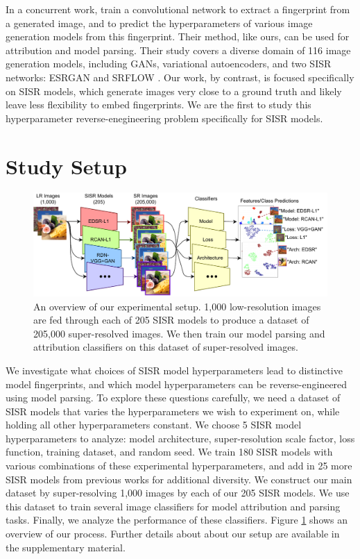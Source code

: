 \documentclass[10pt]{article} %
\begin{document}
In a concurrent work, \cite{Asnani2021ReverseEO} train a convolutional network to extract a fingerprint from a generated image, and to predict the hyperparameters of various image generation models from this fingerprint. Their method, like ours, can be used for  attribution and model parsing. Their study covers a diverse domain of 116 image generation models, including GANs, variational autoencoders, and two SISR networks: ESRGAN  \citep{wang2018esrgan} and SRFLOW \citep{lugmayr2020srflow}. Our work, by contrast, is focused specifically on SISR models, which generate images very close to a ground truth and likely leave less flexibility to embed fingerprints. We are the first to study this hyperparameter reverse-enegineering problem specifically for SISR models.

\section{Study Setup}

\begin{figure}[t]
    \centering
    \includegraphics[width=1.0\textwidth]{figures/Figure_1.pdf}
    \caption{An overview of our experimental setup. 1,000 low-resolution images are fed through
each of 205 SISR models to produce a dataset of 205,000 super-resolved images. We then train our model parsing and attribution classifiers on this dataset of super-resolved images.}
    \label{fig:overview}
\end{figure}

We investigate what choices of SISR model hyperparameters lead to distinctive model fingerprints, and which model hyperparameters can be reverse-engineered using model parsing. To explore these questions carefully, we need a dataset of SISR models that varies the hyperparameters we wish to experiment on, while holding all other hyperparameters constant. We choose 5 SISR model hyperparameters to analyze: model architecture, super-resolution scale factor, loss function, training dataset, and random seed. We train 180 SISR models with various combinations of these experimental hyperparameters, and add in 25 more SISR models from previous works for additional diversity. We construct our main dataset by super-resolving 1,000 images by each of our 205 SISR models. We use this dataset to train several image classifiers for model attribution and parsing tasks. Finally, we analyze the performance of these classifiers. Figure \ref{fig:overview} shows an overview of our process. Further details about about our setup are available in the supplementary material.
\end{document}
